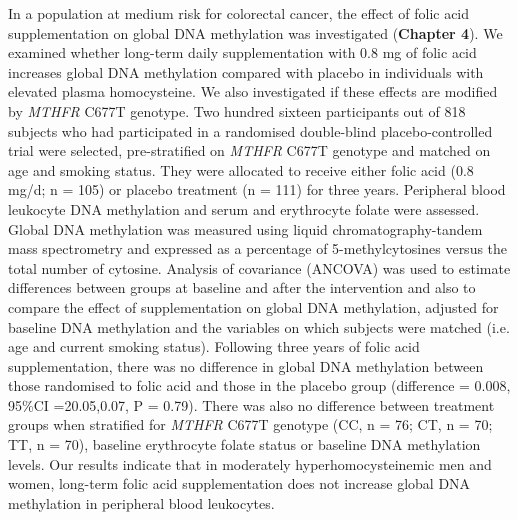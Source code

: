 \noindent In a population at medium risk for colorectal cancer, the effect of folic acid supplementation on global DNA methylation was investigated (\textbf{Chapter 4}). We examined whether long-term daily supplementation with 0.8 mg of folic acid increases global DNA methylation compared with placebo in individuals with elevated plasma homocysteine. We also investigated if these effects are modified by \emph{MTHFR} C677T genotype. Two hundred sixteen participants out of 818 subjects who had participated in a randomised double-blind placebo-controlled trial were selected, pre-stratified on \emph{MTHFR} C677T genotype and matched on age and smoking status. They were allocated to receive either folic acid (0.8 mg/d; n = 105) or placebo treatment (n = 111) for three years. Peripheral blood leukocyte DNA methylation and serum and erythrocyte folate were assessed. Global DNA methylation was measured using liquid chromatography-tandem mass spectrometry and expressed as a percentage of 5-methylcytosines versus the total number of cytosine. Analysis of covariance (ANCOVA) was used to estimate differences between groups at baseline and after the intervention and also to compare the effect of supplementation on global DNA methylation, adjusted for baseline DNA methylation and the variables on which subjects were matched (i.e. age and current smoking status). Following three years of folic acid supplementation, there was no difference in global DNA methylation between those randomised to folic acid and those in the placebo group (difference = 0.008, 95\%CI =20.05,0.07, P = 0.79). There was also no difference between treatment groups when stratified for \emph{MTHFR} C677T genotype (CC, n = 76; CT, n = 70; TT, n = 70), baseline erythrocyte folate status or baseline DNA methylation levels. Our results indicate that in moderately hyperhomocysteinemic men and women, long-term folic acid supplementation does not increase global DNA methylation in peripheral blood leukocytes.


